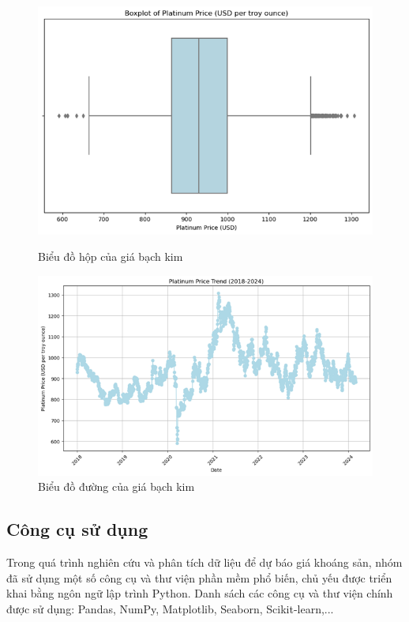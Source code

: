 \documentclass[conference]{IEEEtran}
\begin{document}
\begin{figure}[H]
    \centering
    \begin{minipage}{0.23\textwidth}
    \centering
    \includegraphics[width=1\textwidth]{bibliography/Figure/boxplot_pt.png}
    \caption{Biểu đồ hộp của giá bạch kim}
    \label{fig:5}
    \end{minipage}
    \hfill
    \begin{minipage}{0.23\textwidth}
    \centering
    \includegraphics[width=1\textwidth]{bibliography/Figure/line_pt.png}
    \caption{Biểu đồ đường của giá bạch kim}
    \label{fig:6}
    \end{minipage}
\end{figure}




\subsection{Công cụ sử dụng}
Trong quá trình nghiên cứu và phân tích dữ liệu để dự báo giá khoáng sản, nhóm đã sử dụng một số công cụ và thư viện phần mềm phổ biến, chủ yếu được triển khai bằng ngôn ngữ lập trình Python. Danh sách các công cụ và thư viện chính được sử dụng: Pandas, NumPy, Matplotlib, Seaborn, Scikit-learn,... 
\end{document}
